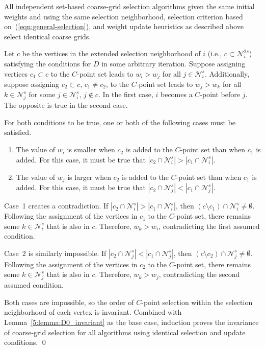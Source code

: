 \documentclass{elsart}
\newenvironment{proof}{\begin{pf}}{\qed\end{pf}}
\begin{document}
\begin{thm}
\label{5:theorem:invariance}
All independent set-based coarse-grid selection algorithms given the
same initial weights and using the same selection neighborhood,
selection criterion based on~(\ref{eqn:general-selection}), and weight
update heuristics as described above select identical coarse grids.
\end{thm}
\begin{proof}
  Let $c$ be the vertices in the extended selection neighborhood of
  $i$ (i.e., $ c \subset\mathcal{N}_i^{2s}$) satisfying the conditions
  for $D$ in some arbitrary iteration. Suppose
  assigning vertices $c_1 \subset c$ to the $C$-point set leads to
  $w_i > w_j$ for all $j \in \mathcal{N}_i^s$. Additionally, suppose
  assigning $c_2 \subset c$, $c_1 \ne c_2$, to the $C$-point set leads
  to $w_j > w_k$ for all $k \in \mathcal{N}_j^s$ for some $j \in
  \mathcal{N}_i^s$, $j \notin c$. In the first case, $i$ becomes a
  $C$-point before $j$. The opposite is true in the second case.

For both conditions to be true, one or both of the following cases
must be satisfied.
\begin{enumerate}
\item The value of $w_i$ is smaller when $c_2$ is added to the
  $C$-point set than when $c_1$ is added. For this case, it must be
  true that $|c_2 \cap \mathcal{N}_i^s| > |c_1 \cap \mathcal{N}_i^s|$.
\item The value of $w_j$ is larger when $c_2$ is added to the
  $C$-point set than when $c_1$ is added. For this case, it must be
  true that $|c_2 \cap \mathcal{N}_j^s| < |c_1 \cap
  \mathcal{N}_j^s|$.
\end{enumerate}

Case~1 creates a contradiction. If $|c_2 \cap \mathcal{N}_i^s| > |c_1
\cap \mathcal{N}_i^s|$, then $(c \setminus c_1) \cap \mathcal{N}_i^s
\ne \emptyset$. Following the assignment of the vertices in $c_1$ to
the $C$-point set, there remains some $k \in \mathcal{N}_i^s$ that is
also in $c$. Therefore, $w_k > w_i$, contradicting the first assumed
condition.

Case~2 is similarly impossible. If $|c_2 \cap \mathcal{N}_j^s| < |c_1
\cap \mathcal{N}_j^s|$, then $(c \setminus c_2) \cap \mathcal{N}_j^s
\ne \emptyset$. Following the assignment of the vertices in $c_2$ to
the $C$-point set, there remains some $k \in \mathcal{N}_j^s$ that is
also in $c$. Therefore, $w_k > w_j$, contradicting the second assumed
condition.

Both cases are impossible, so the order of $C$-point selection within
the selection neighborhood of each vertex is invariant. Combined with
Lemma~\ref{5:lemma:D0_invariant} as the base case, induction proves
the invariance of coarse-grid selection for all algorithms using
identical selection and update conditions.
\end{proof}
\end{document}
